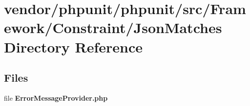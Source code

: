 \section{vendor/phpunit/phpunit/src/\+Framework/\+Constraint/\+Json\+Matches Directory Reference}
\label{dir_0cd1deaa284f157d951614bcbd9bccce}
\subsection*{Files}
\begin{DoxyCompactItemize}
\item 
file {\bf Error\+Message\+Provider.\+php}
\end{DoxyCompactItemize}
